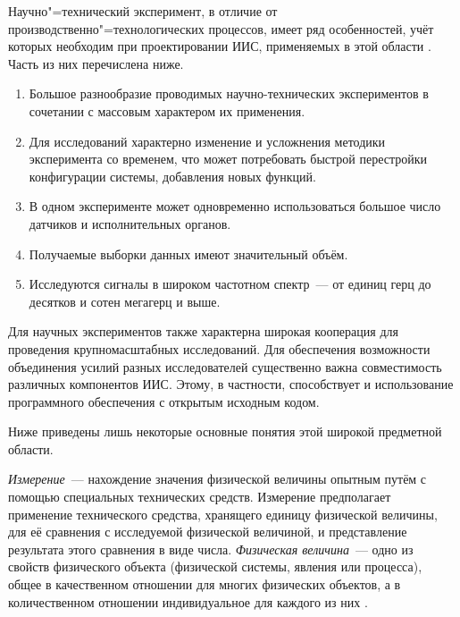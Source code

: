 \documentclass[a4paper, 14pt, titlepage]{extarticle}
\newcommand{\term}[1]{\emph{#1}}
\begin{document}
  Научно"=технический эксперимент, в отличие от производственно"=технологических процессов, имеет ряд
  особенностей, учёт которых необходим при проектировании ИИС, применяемых в этой области \cite[с.~17]{rannev-iis}.
  Часть из них перечислена ниже.
  \begin{enumerate}
    \item Большое разнообразие проводимых научно-технических экспериментов в сочетании с массовым
      характером их применения.
    \item Для исследований характерно изменение и усложнения методики эксперимента со временем,
      что может потребовать быстрой перестройки конфигурации системы, добавления новых функций.
    \item В одном эксперименте может одновременно использоваться большое число датчиков и
      исполнительных органов.
    \item Получаемые выборки данных имеют значительный объём.
    \item Исследуются сигналы в широком частотном спектр~--- от единиц герц до десятков и сотен
      мегагерц и выше.
  \end{enumerate}
  Для научных экспериментов также характерна широкая кооперация для проведения крупномасштабных
  исследований. Для обеспечения возможности объединения усилий разных исследователей существенно
  важна совместимость различных компонентов ИИС. Этому, в частности, способствует и использование
  программного обеспечения с открытым исходным кодом.

  Ниже приведены лишь некоторые основные понятия этой широкой предметной области.

  \term{Измерение}~--- нахождение значения физической величины опытным путём с помощью специальных
  технических средств. Измерение предполагает применение технического средства, хранящего единицу
  физической величины, для её сравнения с исследуемой физической величиной, и представление
  результата этого сравнения в виде числа.
  \term{Физическая величина}~--- одно из свойств физического объекта (физической системы, явления
  или процесса), общее в качественном отношении для многих физических объектов, а в количественном
  отношении индивидуальное для каждого из них \cite[с.~7]{rannev-iis}.
\end{document}
